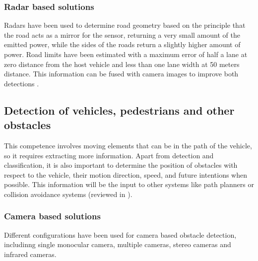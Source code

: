 \documentclass[journal]{IEEEtran}
\begin{document}

\subsubsection{Radar based solutions}
Radars have been used to determine road geometry based on the principle that the
road acts as a mirror for the sensor, returning a very small amount of the 
emitted power, while the sides of the roads return a slightly higher 
amount of power. Road limits have been estimated with a
maximum error of half a lane at zero distance from the host vehicle and less 
than one lane width at 50 meters distance. This information can be fused with
camera images to improve both detections 
\cite{kaliyaperumal2001algorithm, ma2000simultaneous, Janda2013}.

\subsection{Detection of vehicles, pedestrians and other obstacles}
This competence involves moving elements that can be in the path of the 
vehicle, so it requires extracting more information. Apart from detection and 
classification, it is also important to determine the position of obstacles 
with respect to the vehicle, their motion direction, speed, and 
future intentions when possible. 
This information will be the input to other systems like path planners 
or collision avoidance systems (reviewed in \cite{mukhtar2015vehicle}).

\subsubsection{Camera based solutions}
Different configurations have been used for camera based obstacle detection, 
includinng single monocular camera, multiple cameras, stereo cameras and 
infrared cameras.
\end{document}
